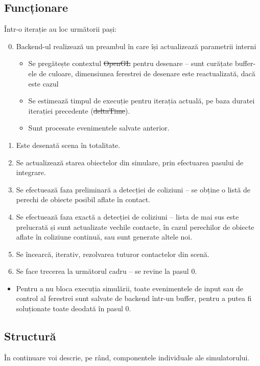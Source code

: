 \documentclass[12pt,a4paper]{report}
\providecommand{\DIFaddtex}[1]{{\protect\color{blue}\uwave{#1}}} %
\providecommand{\DIFdeltex}[1]{{\protect\color{red}\sout{#1}}}                      %
\providecommand{\DIFaddbegin}{} %
\providecommand{\DIFaddend}{} %
\providecommand{\DIFdelbegin}{} %
\providecommand{\DIFdelend}{} %
\providecommand{\DIFadd}[1]{\texorpdfstring{\DIFaddtex{#1}}{#1}} %
\providecommand{\DIFdel}[1]{\texorpdfstring{\DIFdeltex{#1}}{}} %
\newcommand{\DIFscaledelfig}{0.5}
\newlength{\DIFdelgraphicswidth} %
\newlength{\DIFdelgraphicsheight} %
\newcommand{\DIFaddincludegraphics}[2][]{{\color{blue}\fbox{\DIFOincludegraphics[#1]{#2}}}} %
\newcommand{\DIFdelincludegraphics}[2][]{%
	\sbox{\DIFdelgraphicsbox}{\DIFOincludegraphics[#1]{#2}}%
	\settoboxwidth{\DIFdelgraphicswidth}{\DIFdelgraphicsbox} %
	\settoboxtotalheight{\DIFdelgraphicsheight}{\DIFdelgraphicsbox} %
	\scalebox{\DIFscaledelfig}{%
		\parbox[b]{\DIFdelgraphicswidth}{\usebox{\DIFdelgraphicsbox}\\[-\baselineskip] \rule{\DIFdelgraphicswidth}{0em}}\llap{\resizebox{\DIFdelgraphicswidth}{\DIFdelgraphicsheight}{%
				\setlength{\unitlength}{\DIFdelgraphicswidth}%
				\begin{picture}(1,1)%
				\thicklines\linethickness{2pt} %
				{\color[rgb]{1,0,0}\put(0,0){\framebox(1,1){}}}%
				{\color[rgb]{1,0,0}\put(0,0){\line( 1,1){1}}}%
				{\color[rgb]{1,0,0}\put(0,1){\line(1,-1){1}}}%
				\end{picture}%
			}\hspace*{3pt}}} %
} %
\DeclareRobustCommand{\DIFaddbegin}{\DIFOaddbegin \let\includegraphics\DIFaddincludegraphics} %
\DeclareRobustCommand{\DIFaddend}{\DIFOaddend \let\includegraphics\DIFOincludegraphics} %
\DeclareRobustCommand{\DIFdelbegin}{\DIFOdelbegin \let\includegraphics\DIFdelincludegraphics} %
\DeclareRobustCommand{\DIFdelend}{\DIFOaddend \let\includegraphics\DIFOincludegraphics} %
\begin{document}
	\subsection{Funcționare}
	Într-o iterație au loc următorii pași:
	\begin{enumerate}
		\setcounter{enumi}{-1}
		\item Backend-ul realizează un preambul în care își actualizează parametrii interni
		\begin{itemize}
			\item Se pregătește contextul \DIFdelbegin \DIFdel{OpenGL }\DIFdelend \DIFaddbegin \textit{\DIFadd{OpenGL}} \DIFaddend pentru desenare -- sunt curățate buffer-ele de culoare, dimensiunea ferestrei de desenare este reactualizată, dacă este cazul
			\item Se estimează timpul de execuție pentru iterația actuală, pe baza duratei iterației precedente (\DIFdelbegin \DIFdel{deltaTime}\DIFdelend \DIFaddbegin \textit{\DIFadd{deltaTime}}\DIFaddend ).
			\item Sunt procesate evenimentele salvate anterior.
		\end{itemize}
		\item Este desenată scena în totalitate.
		\item Se actualizează starea obiectelor din simulare, prin efectuarea pasului de integrare.
		\item Se efectuează faza preliminară a detecției de coliziuni -- se obține o listă de perechi de obiecte posibil aflate în contact.
		\item Se efectuează faza exactă a detecției de coliziuni -- lista de mai sus este prelucrată și sunt actualizate vechile contacte, în cazul perechilor de obiecte aflate în coliziune continuă, sau sunt generate altele noi.
		\item Se încearcă, iterativ, rezolvarea tuturor contactelor din scenă.
		\item Se face trecerea la următorul cadru -- se revine la pasul 0.
	\end{enumerate}
	\begin{itemize}
		\item Pentru a nu bloca execuția simulării, toate evenimentele de input sau de control al ferestrei sunt salvate de backend într-un buffer, pentru a putea fi soluționate toate deodată în pasul 0.
	\end{itemize}
	
	\subsection{Structură}
	În continuare voi descrie, pe rând, componentele individuale ale simulatorului.
	
\end{document}
